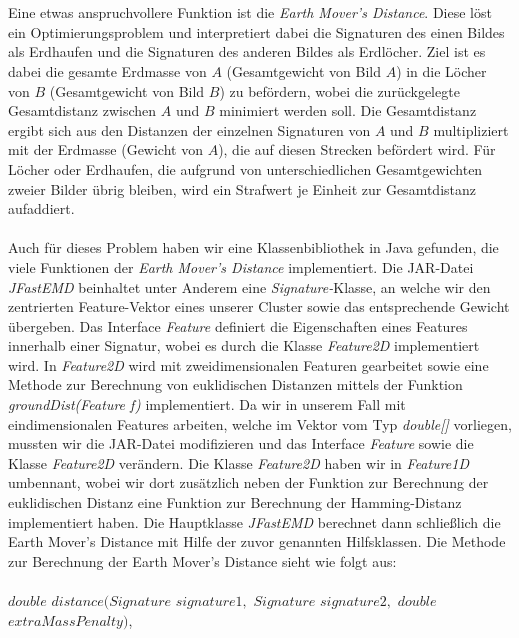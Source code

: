 \documentclass{scrartcl}
\begin{document}
\\
\\ 
Eine etwas anspruchvollere Funktion ist die \textit{Earth Mover's Distance}. Diese löst ein Optimierungsproblem und interpretiert dabei  die Signaturen des einen Bildes als Erdhaufen und die Signaturen des anderen Bildes als Erdlöcher. Ziel ist es dabei die gesamte Erdmasse von $A$ (Gesamtgewicht von Bild $A$) in die Löcher von $B$ (Gesamtgewicht von Bild $B$) zu befördern, wobei die zurückgelegte Gesamtdistanz zwischen $A$ und $B$ minimiert werden soll. Die Gesamtdistanz ergibt sich aus den Distanzen der einzelnen Signaturen von $A$ und $B$ multipliziert mit der Erdmasse (Gewicht von $A$), die auf diesen Strecken befördert wird. Für Löcher oder Erdhaufen, die aufgrund von unterschiedlichen Gesamtgewichten zweier Bilder übrig bleiben, wird ein Strafwert je Einheit zur Gesamtdistanz aufaddiert.
\\
\\
Auch für dieses Problem haben wir eine Klassenbibliothek in Java gefunden, die viele Funktionen der \textit{Earth Mover's Distance} implementiert. Die JAR-Datei \textit{JFastEMD} beinhaltet unter Anderem eine \textit{Signature-}Klasse, an welche wir den zentrierten Feature-Vektor eines unserer Cluster sowie das entsprechende Gewicht übergeben. Das Interface \textit{Feature} definiert die Eigenschaften eines Features innerhalb einer Signatur, wobei es durch die Klasse \textit{Feature2D} implementiert wird. In \textit{Feature2D} wird mit zweidimensionalen Featuren gearbeitet sowie eine Methode zur Berechnung von euklidischen Distanzen mittels der Funktion \textit{groundDist(Feature f)} implementiert. Da wir in unserem Fall mit eindimensionalen Features arbeiten, welche im Vektor vom Typ \textit{double[]} vorliegen, mussten wir die JAR-Datei modifizieren und das Interface \textit{Feature} sowie die Klasse \textit{Feature2D} verändern. Die Klasse \textit{Feature2D} haben wir in \textit{Feature1D} umbennant, wobei wir dort zusätzlich neben der Funktion zur Berechnung der euklidischen Distanz eine Funktion zur Berechnung der Hamming-Distanz implementiert haben. Die Hauptklasse \textit{JFastEMD} berechnet dann schließlich die Earth Mover's Distance mit Hilfe der zuvor genannten Hilfsklassen. Die Methode zur Berechnung der Earth Mover's Distance sieht wie folgt aus:
\\
\\
$double$ $distance(Signature$ $signature1,$ $Signature$  $signature2,$ $double$ $extraMassPenalty)$,
\\
\\
\end{document}

